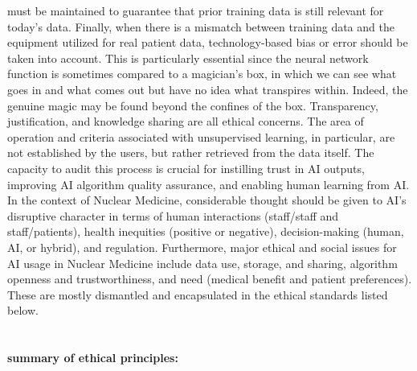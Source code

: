 \documentclass[12pt]{article}
\begin{document}
must be maintained to guarantee that prior training data is still relevant for today's data. Finally, when there is a
mismatch between training data and the equipment utilized for real patient data, technology-based bias or
error should be taken into account. This is particularly essential since the neural network function is sometimes
compared to a magician's box, in which we can see what goes in and what comes out but have no idea what
transpires within. Indeed, the genuine magic may be found beyond the confines of the box. Transparency,
justification, and knowledge sharing are all ethical concerns. The area of operation and criteria associated with
unsupervised learning, in particular, are not established by the users, but rather retrieved from the data itself. The capacity to audit this process is crucial for instilling trust in AI outputs, improving AI algorithm quality
assurance, and enabling human learning from AI.
In the context of Nuclear Medicine, considerable thought should be given to AI's disruptive character in terms of
human interactions (staff/staff and staff/patients), health inequities (positive or negative), decision-making
(human, AI, or hybrid), and regulation. Furthermore, major ethical and social issues for AI usage in Nuclear
Medicine include data use, storage, and sharing, algorithm openness and trustworthiness, and need (medical
benefit and patient preferences). These are mostly dismantled and encapsulated in the ethical standards listed
below.
\\ 


\\ \noindent
\\ \textbf{\large summary of ethical principles:}\\ \\
\end{document}
